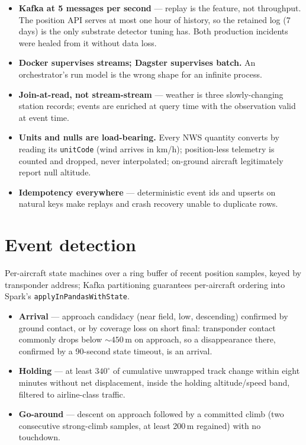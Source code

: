 \documentclass[11pt]{article}
\newcommand{\code}[1]{\texttt{\small #1}}
\begin{document}
\begin{itemize}
\item \textbf{Kafka at 5 messages per second} --- replay is the feature, not
throughput. The position API serves at most one hour of history, so the
retained log (7 days) is the only substrate detector tuning has. Both
production incidents were healed from it without data loss.
\item \textbf{Docker supervises streams; Dagster supervises batch.} An
orchestrator's run model is the wrong shape for an infinite process.
\item \textbf{Join-at-read, not stream-stream} --- weather is three
slowly-changing station records; events are enriched at query time with the
observation valid at event time.
\item \textbf{Units and nulls are load-bearing.} Every NWS quantity converts
by reading its \code{unitCode} (wind arrives in km/h); position-less
telemetry is counted and dropped, never interpolated; on-ground aircraft
legitimately report null altitude.
\item \textbf{Idempotency everywhere} --- deterministic event ids and upserts
on natural keys make replays and crash recovery unable to duplicate rows.
\end{itemize}

\section{Event detection}

Per-aircraft state machines over a ring buffer of recent position samples,
keyed by transponder address; Kafka partitioning guarantees per-aircraft
ordering into Spark's \code{applyInPandasWithState}.

\begin{itemize}
\item \textbf{Arrival} --- approach candidacy (near field, low, descending)
confirmed by ground contact, or by coverage loss on short final: transponder
contact commonly drops below ${\sim}450$\,m on approach, so a disappearance
there, confirmed by a 90-second state timeout, is an arrival.
\item \textbf{Holding} --- at least $340^{\circ}$ of cumulative unwrapped
track change within eight minutes without net displacement, inside the
holding altitude/speed band, filtered to airline-class traffic.
\item \textbf{Go-around} --- descent on approach followed by a committed
climb (two consecutive strong-climb samples, at least 200\,m regained) with
no touchdown.
\end{itemize}
\end{document}
